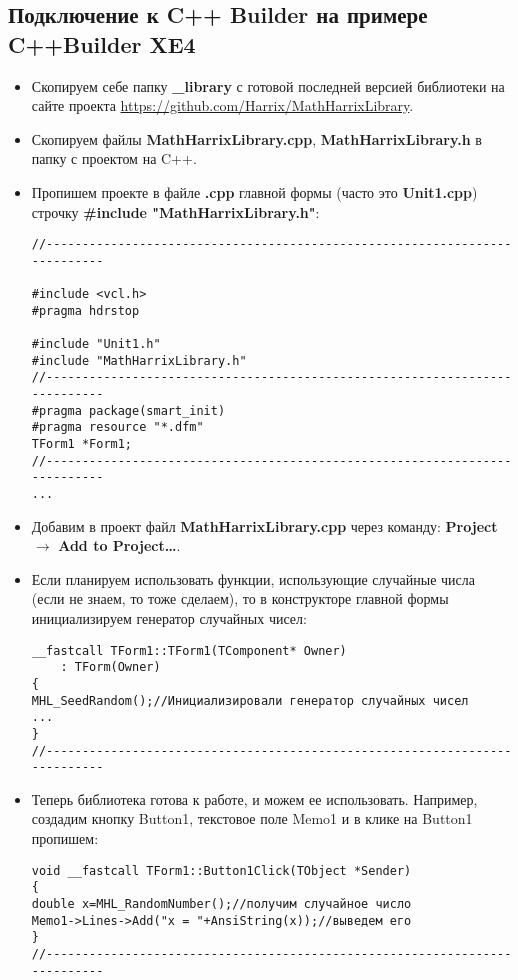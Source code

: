 \documentclass[a4paper,12pt]{article}
\begin{document}
\subsection{Подключение к C++ Builder на примере C++Builder XE4}
\begin{itemize}
\item Скопируем себе папку \textbf{\_library} с готовой последней версией библиотеки на сайте проекта \href{https://github.com/Harrix/MathHarrixLibrary}{https://github.com/Harrix/MathHarrixLibrary}.

\item Скопируем файлы \textbf{MathHarrixLibrary.cpp}, \textbf{MathHarrixLibrary.h} в папку с проектом на C++.

\item Пропишем проекте в файле \textbf{.cpp} главной формы (часто это \textbf{Unit1.cpp}) строчку \textbf{\#include "MathHarrixLibrary.h"}:
\begin{lstlisting}[label=install_code_04,caption=Подключение библиотеки]
//---------------------------------------------------------------------------

#include <vcl.h>
#pragma hdrstop

#include "Unit1.h"
#include "MathHarrixLibrary.h"
//---------------------------------------------------------------------------
#pragma package(smart_init)
#pragma resource "*.dfm"
TForm1 *Form1;
//---------------------------------------------------------------------------
...
\end{lstlisting}

\item Добавим в проект файл \textbf{MathHarrixLibrary.cpp} через команду: \textbf{Project} $\rightarrow$ \textbf{Add to Project\dots}.

\item Если планируем использовать функции, использующие случайные числа (если не знаем, то тоже сделаем), то в конструкторе главной формы инициализируем генератор случайных чисел:
\begin{lstlisting}[label=install_code_05,caption=Инициализация генератора случайных чисел]
__fastcall TForm1::TForm1(TComponent* Owner)
	: TForm(Owner)
{
MHL_SeedRandom();//Инициализировали генератор случайных чисел
...
}
//---------------------------------------------------------------------------
\end{lstlisting}

\item Теперь библиотека готова к работе, и можем ее использовать. Например, создадим кнопку Button1, текстовое поле Memo1 и в клике на Button1 пропишем:
\begin{lstlisting}[label=install_code_06,caption=Пример использования]
void __fastcall TForm1::Button1Click(TObject *Sender)
{
double x=MHL_RandomNumber();//получим случайное число
Memo1->Lines->Add("x = "+AnsiString(x));//выведем его
}
//---------------------------------------------------------------------------
\end{lstlisting}
\end{itemize}
\end{document}
